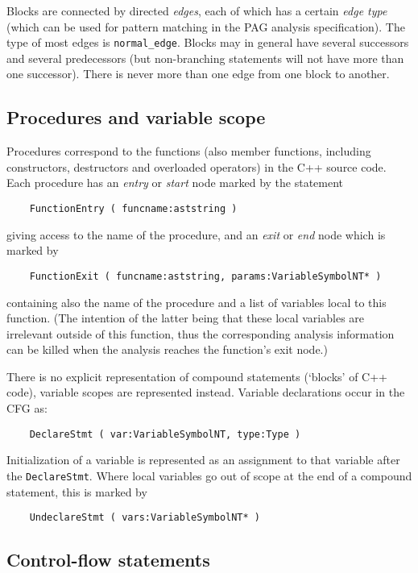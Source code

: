 \documentclass[12pt]{article}
\begin{document}
Blocks are connected by directed \emph{edges}, each of which has a
certain \emph{edge type} (which can be used for pattern matching in
the PAG analysis specification). The type of most edges is
\verb|normal_edge|. Blocks may in general have several successors
and several predecessors (but non-branching statements will
not have more than one successor). There is never more than one edge
from one block to another.

\subsection{Procedures and variable scope}

Procedures correspond to the functions (also member functions,
including constructors, destructors and overloaded operators) in the
C++ source code. Each procedure has an \emph{entry} or \emph{start}
node marked by the statement
\begin{verbatim}
    FunctionEntry ( funcname:aststring )
\end{verbatim}
giving access to the name of the procedure, and an \emph{exit} or
\emph{end} node which is marked by
\begin{verbatim}
    FunctionExit ( funcname:aststring, params:VariableSymbolNT* )
\end{verbatim}
containing also the name of the procedure and a list of variables
local to this function. (The intention of the latter being that
these local variables are irrelevant outside of this function, thus
the corresponding analysis information can be killed when the
analysis reaches the function's exit node.)

There is no explicit representation of compound statements (`blocks'
of C++ code), variable scopes are represented instead. Variable
declarations occur in the CFG as:
\begin{verbatim}
    DeclareStmt ( var:VariableSymbolNT, type:Type )
\end{verbatim}
Initialization of a variable is represented as an assignment to that
variable after the \verb|DeclareStmt|. Where local variables go out
of scope at the end of a compound statement, this is marked by
\begin{verbatim}
    UndeclareStmt ( vars:VariableSymbolNT* )
\end{verbatim}

\subsection{Control-flow statements}
\end{document}
